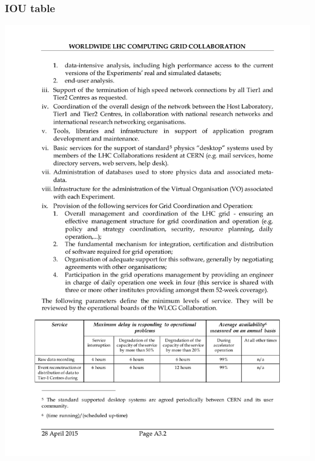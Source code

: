 \documentclass{beamer}
\begin{document}
\begin{frame}
  \frametitle{IOU table}
  \includegraphics[scale=0.51,trim={1cm 5cm 1cm 18cm},clip]{mou_page23.pdf}\\

\end{frame}
\end{document}
